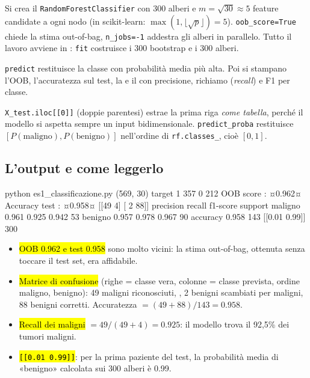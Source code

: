 \begin{tecnica}
Si crea il \texttt{RandomForestClassifier} con 300 alberi e $m=\sqrt{30}\approx5$ feature candidate a ogni nodo (in scikit-learn: $\max(1,\lfloor\sqrt{p}\rfloor)=5$). \texttt{oob\_score=True} chiede la stima out-of-bag, \texttt{n\_jobs=-1} addestra gli alberi in parallelo. Tutto il lavoro avviene in : \texttt{fit} costruisce i 300 bootstrap e i 300 alberi.
\end{tecnica}

\begin{tecnica}
\texttt{predict} restituisce la classe con probabilità media più alta. Poi si stampano l'OOB, l'accuratezza sul test, la  e il  con precisione, richiamo (\emph{recall}) e F1 per classe.
\end{tecnica}

\begin{tecnica}
\texttt{X\_test.iloc[[0]]} (doppie parentesi) estrae la prima riga \emph{come tabella}, perché il modello si aspetta sempre un input bidimensionale. \texttt{predict\_proba} restituisce $[P(\text{maligno}),P(\text{benigno})]$ nell'ordine di \texttt{rf.classes\_}, cioè $[0,1]$.
\end{tecnica}

\subsection{L'output e come leggerlo}

\begin{terminale}{python es1_classificazione.py}
(569, 30)
target
1    357
0    212
OOB score     : ¤0.962¤
Accuracy test : ¤0.958¤
[[49  4]
 [ 2 88]]
              precision    recall  f1-score   support
     maligno      0.961     0.925     0.942        53
     benigno      0.957     0.978     0.967        90
    accuracy                          0.958       143
[[0.01 0.99]]
300
\end{terminale}

\begin{esempio}[Interpretazione]
\begin{itemize}
  \item \hl{OOB 0.962 e test 0.958} sono molto vicini: la stima out-of-bag, ottenuta senza toccare il test set, era affidabile.
  \item \hl{Matrice di confusione} (righe = classe vera, colonne = classe prevista, ordine maligno, benigno): 49 maligni riconosciuti, , 2 benigni scambiati per maligni, 88 benigni corretti. Accuratezza $=(49+88)/143=0.958$.
  \item \hl{Recall dei maligni} $=49/(49+4)=0.925$: il modello trova il 92{,}5\% dei tumori maligni.
  \item \hl{\texttt{[[0.01 0.99]]}}: per la prima paziente del test, la probabilità media di «benigno» calcolata sui 300 alberi è 0.99.
\end{itemize}
\end{esempio}

